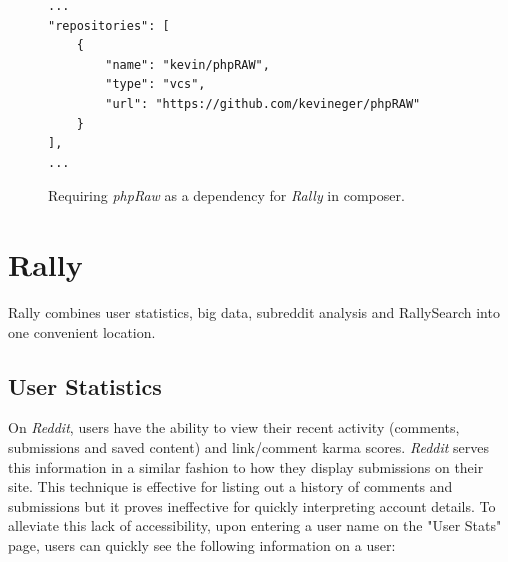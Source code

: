 \documentclass[msc,oneside]{ubcthesis}%
\begin{document}
\begin{figure}[H]
\begin{lstlisting}
...
"repositories": [
	{
		"name": "kevin/phpRAW",
		"type": "vcs",
		"url": "https://github.com/kevineger/phpRAW"
	}
],
...
\end{lstlisting}
\caption[Requiring phpRaw as a dependency in composer.]{
Requiring \textit{phpRaw} as a dependency for \textit{Rally} in composer.}
\label{fig:composer}
\end{figure}

\section{Rally}
Rally combines user statistics, big data, subreddit analysis and RallySearch into one convenient location.
\subsection{User Statistics}
On \textit{Reddit}, users have the ability to view their recent activity (comments, submissions and saved content) and link/comment karma scores. \textit{Reddit} serves this information in a similar fashion to how they display submissions on their site. This technique is effective for listing out a history of comments and submissions but it proves ineffective for quickly interpreting account details. To alleviate this lack of accessibility, upon entering a user name on the "User Stats" page, users can quickly see the following information on a user:
\end{document}
